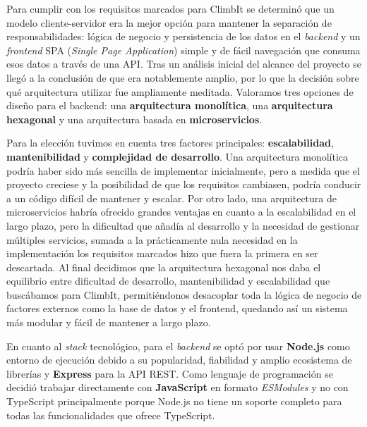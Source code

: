 Para cumplir con los requisitos marcados para ClimbIt se determinó que un modelo cliente-servidor era la mejor opción para mantener la separación de responsabilidades: lógica de negocio y persistencia de los datos en el \textit{backend} y un \textit{frontend} SPA (\textit{Single Page Application}) simple y de fácil navegación que consuma esos datos a través de una API. Tras un análisis inicial del alcance del proyecto se llegó a la conclusión de que era notablemente amplio, por lo que la decisión sobre qué arquitectura utilizar fue ampliamente meditada. Valoramos tres opciones de diseño para el backend: una \textbf{arquitectura monolítica}, una \textbf{arquitectura hexagonal} y una arquitectura basada en \textbf{microservicios}. 

Para la elección tuvimos en cuenta tres factores principales: \textbf{escalabilidad}, \textbf{mantenibilidad} y  \textbf{complejidad de desarrollo}. Una arquitectura monolítica podría haber sido más sencilla de implementar inicialmente, pero a medida que el proyecto creciese y la posibilidad de que los requisitos cambiasen, podría conducir a un código difícil de mantener y escalar. Por otro lado, una arquitectura de microservicios habría ofrecido grandes ventajas en cuanto a la escalabilidad en el largo plazo, pero la dificultad que añadía al desarrollo y la necesidad de gestionar múltiples servicios, sumada a la prácticamente nula necesidad en la implementación los requisitos marcados hizo que fuera la primera en ser descartada. Al final decidimos que la arquitectura hexagonal nos daba el equilibrio entre dificultad de desarrollo, mantenibilidad y escalabilidad que buscábamos para ClimbIt, permitiéndonos desacoplar toda la lógica de negocio de factores externos como la base de datos y el frontend, quedando así un sistema más modular y fácil de mantener a largo plazo.

En cuanto al \textit{stack} tecnológico, para el \textit{backend} se optó por usar \textbf{Node.js} \citep{nodejs_doc} como entorno de ejecución debido a su popularidad, fiabilidad y amplio ecosistema de librerías y \textbf{Express} \citep{express_framework} para la API REST. Como lenguaje de programación se decidió trabajar directamente con \textbf{JavaScript} en formato \textit{ESModules} y no con TypeScript principalmente porque Node.js no tiene un soporte completo para todas las funcionalidades que ofrece TypeScript.

